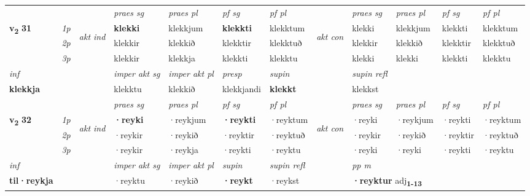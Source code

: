 \begin{longtable}[l]{X>{\footnotesize\itshape}llXXXXlXXXX}
 & &   & \textit{praes sg}  & \textit{praes pl}    & \textit{ pf sg} & \textit{pf pl} & & \textit{praes sg}  & \textit{praes pl}    & \textit{pf sg} & \textit{pf pl }  \\ \cmidrule{4-7} \cmidrule{9-12}
 \multirow{2}{*}{{{\textbf{v{\textsubscript{2}}} \Large{\textbf{31}}}}}  & 1p & \multirow{3}{*}{\begin{turn}{90}\textit{akt ind}\end{turn}} & \textbf{klekki} & klekkjum & \textbf{klekkti} & klekktum & \multirow{3}{*}{\begin{turn}{90}\textit{akt con}\end{turn}} &klekki & klekkjum & klekkti & klekktum\\*
 & 2p &  &  klekkir  & klekkið & klekktir & klekktuð & & klekkir & klekkið & klekktir & klekktuð \\*
 & 3p &  & klekkir & klekkja & klekkti & klekktu & & klekki & klekki& klekkti & klekktu \\*
\cmidrule{4-7} \cmidrule{9-12}

   {\textit{inf}} & &  & \textit{imper akt sg} & \textit{imper akt pl}   & \textit{presp} & \textit{supin} && \textit{supin refl}  \\*
  {\textbf{klekkja}} & && klekktu  & klekkið   & klekkjandi &  \textbf{klekkt} && klekkst  \\*

\midrule

 & &   & \textit{praes sg}  & \textit{praes pl}    & \textit{ pf sg} & \textit{pf pl} & & \textit{praes sg}  & \textit{praes pl}    & \textit{pf sg} & \textit{pf pl }  \\ \cmidrule{4-7} \cmidrule{9-12}
 \multirow{2}{*}{{{\textbf{v{\textsubscript{2}}} \Large{\textbf{32}}}}}  & 1p & \multirow{3}{*}{\begin{turn}{90}\textit{akt ind}\end{turn}} & \textbf{·reyki} & ·reykjum & \textbf{·reykti} & ·reyktum & \multirow{3}{*}{\begin{turn}{90}\textit{akt con}\end{turn}} &·reyki & ·reykjum & ·reykti & ·reyktum\\*
 & 2p &  &  ·reykir  & ·reykið & ·reyktir & ·reyktuð & & ·reykir & ·reykið & ·reyktir & ·reyktuð \\*
 & 3p &  & ·reykir & ·reykja & ·reykti & ·reyktu & & ·reyki & ·reyki& ·reykti & ·reyktu \\*
\cmidrule{4-7} \cmidrule{9-12}

   {\textit{inf}} & &  & \textit{imper akt sg} & \textit{imper akt pl}    & \textit{supin} & \textit{supin refl} && \textit{pp m} \\*
  {\textbf{til\allowbreak ·reykja}} & && ·reyktu  & ·reykið    &  \textbf{·reykt} & ·reykst && \multicolumn{2}{l}{\textbf{·reyktur} adj\textbf{\textsubscript{1-13}}} \\*


\end{longtable}
